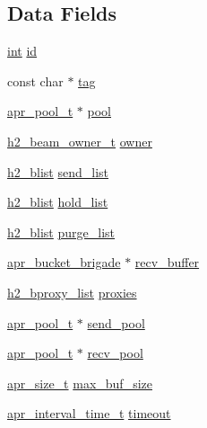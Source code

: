 \subsection*{Data Fields}
\begin{DoxyCompactItemize}
\item 
\hyperlink{pcre_8txt_a42dfa4ff673c82d8efe7144098fbc198}{int} \hyperlink{structh2__bucket__beam_a1db363a58592968137a74e201e6f0cbd}{id}
\item 
const char $\ast$ \hyperlink{structh2__bucket__beam_a466b18a57540f16a61ca8cd77fe7f671}{tag}
\item 
\hyperlink{structapr__pool__t}{apr\+\_\+pool\+\_\+t} $\ast$ \hyperlink{structh2__bucket__beam_a12dbf9e2adca7f75e8b31e94077ff380}{pool}
\item 
\hyperlink{h2__bucket__beam_8h_a58b344ca9a9d6f9eb565be35bb08cfd4}{h2\+\_\+beam\+\_\+owner\+\_\+t} \hyperlink{structh2__bucket__beam_a6e809164f212ba83914fd0e9c718f8b8}{owner}
\item 
\hyperlink{structh2__blist}{h2\+\_\+blist} \hyperlink{structh2__bucket__beam_a4d34acc931115f6fbedfacf854c32982}{send\+\_\+list}
\item 
\hyperlink{structh2__blist}{h2\+\_\+blist} \hyperlink{structh2__bucket__beam_a2814c491bc0213e6ea3c083a6d08f496}{hold\+\_\+list}
\item 
\hyperlink{structh2__blist}{h2\+\_\+blist} \hyperlink{structh2__bucket__beam_acf26953a9598b9a3f89acbd061dedfca}{purge\+\_\+list}
\item 
\hyperlink{structapr__bucket__brigade}{apr\+\_\+bucket\+\_\+brigade} $\ast$ \hyperlink{structh2__bucket__beam_a5db9d81dd0b2e09b20debb54d934b7ca}{recv\+\_\+buffer}
\item 
\hyperlink{structh2__bproxy__list}{h2\+\_\+bproxy\+\_\+list} \hyperlink{structh2__bucket__beam_a251b111e88c647ae607c2b531400ccc4}{proxies}
\item 
\hyperlink{structapr__pool__t}{apr\+\_\+pool\+\_\+t} $\ast$ \hyperlink{structh2__bucket__beam_a6f8b5ac7e0727af4a3f660e49516dd93}{send\+\_\+pool}
\item 
\hyperlink{structapr__pool__t}{apr\+\_\+pool\+\_\+t} $\ast$ \hyperlink{structh2__bucket__beam_af9844c7d594f6854d4351bddaa8b746f}{recv\+\_\+pool}
\item 
\hyperlink{group__apr__platform_gaaa72b2253f6f3032cefea5712a27540e}{apr\+\_\+size\+\_\+t} \hyperlink{structh2__bucket__beam_a834617c8352877538dbae28da65cb464}{max\+\_\+buf\+\_\+size}
\item 
\hyperlink{group__apr__time_gaae2129185a395cc393f76fabf4f43e47}{apr\+\_\+interval\+\_\+time\+\_\+t} \hyperlink{structh2__bucket__beam_a9ba0775fefa710e2f7d5cd261725d943}{timeout}

\end{DoxyCompactItemize}
